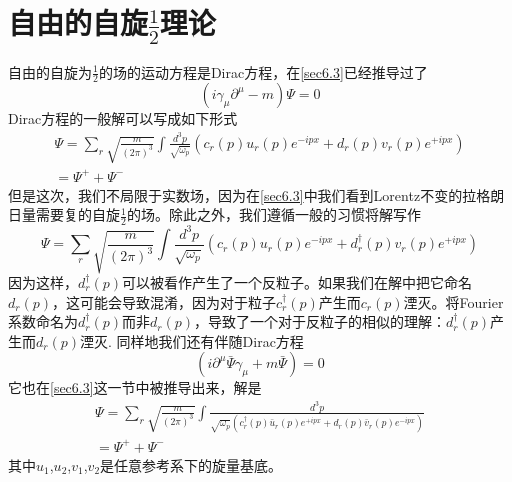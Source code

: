 \section{自由的自旋$\frac{1}{2}$理论}
\label{sec9.3}
自由的自旋为$\frac{1}{2}$的场的运动方程是Dirac方程，在\ref{sec6.3}已经推导过了
$$(i\gamma_{\mu}\partial^{\mu}-m)\Psi=0$$
Dirac方程的一般解可以写成如下形式
\begin{align} \label{equ9.33}
\Psi=\sum_{r} \sqrt{ \frac{m}{(2\pi)^{3}} }\int \frac{d^{3}p}{\sqrt{\omega_{p}}} (c_{r}(p)u_{r}(p)e^{-ipx}+d_{r}(p)v_{r}(p)e^{+ipx})\\
=\Psi^{+}+\Psi^{-}
\end{align}
但是这次，我们不局限于实数场，因为在\ref{sec6.3}中我们看到Lorentz不变的拉格朗日量需要复的自旋$\frac{1}{2}$的场。除此之外，我们遵循一般的习惯将解写作
\begin{equation}\label{equ 9.34}
\Psi = \sum_{r} \sqrt{\frac{m}{(2\pi)^{3}}}\int \frac{d^{3}p}{\sqrt{\omega_{p}}}(c_{r}(p)u_{r}(p)e^{-ipx}+d^{\dagger}_{r}(p)v_{r}(p)e^{+ipx})
\end{equation}
因为这样，$d^{\dagger}_{r}(p)$可以被看作产生了一个反粒子。如果我们在解中把它命名$d_{r}(p)$，这可能会导致混淆，因为对于粒子$c^{\dagger}_{r}(p)$产生而$c_{r}(p)$湮灭。将Fourier系数命名为$d_{r}^{\dagger}(p)$而非$d_{r}(p)$，导致了一个对于反粒子的相似的理解：$d^{\dagger}_{r}(p)$产生而$d_{r}(p)$湮灭.
同样地我们还有伴随Dirac方程
$$(i\partial^{\mu}\bar{\Psi} \gamma_{\mu}+m\bar{\Psi})=0$$
它也在\ref{sec6.3}这一节中被推导出来，解是
\begin{align} \label{equ9.35}
\Psi=\sum_{r} \sqrt{\frac{m}{(2\pi)^{3}}}\int \frac{d^{3}p}{\sqrt{\omega_{p}}(c^{\dagger}_{r}(p)\bar{u}_{r}(p)e^{+ipx}+d_{r}(p)\bar{v}_{r}(p)e^{-ipx})}\\
=\Psi^{+}+\Psi^{-}
\end{align}
其中$u_{1}$,$u_{2}$,$v_{1}$,$v_{2}$是任意参考系下的旋量基底。

